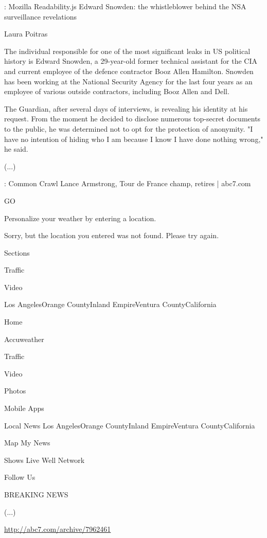 \documentclass[12pt, utf8, ngerman]{beamer}
\begin{document}
\begin{frame}{\insertsection: Mozilla Readability.js}
    \scriptsize
    Edward Snowden: the whistleblower behind the NSA surveillance revelations

    Laura Poitras

    The individual responsible for one of the most significant leaks in US political history is Edward Snowden, a 29-year-old former technical assistant for the CIA and current employee of the defence contractor Booz Allen Hamilton. Snowden has been working at the National Security Agency for the last four years as an employee of various outside contractors, including Booz Allen and Dell.

    The Guardian, after several days of interviews, is revealing his identity at his request. From the moment he decided to disclose numerous top-secret documents to the public, he was determined not to opt for the protection of anonymity. "I have no intention of hiding who I am because I know I have done nothing wrong," he said.

    (...)
\end{frame}

\begin{frame}{\insertsection: Common Crawl}
    \scriptsize
    Lance Armstrong, Tour de France champ, retires | abc7.com

    GO

    Personalize your weather by entering a location.

    Sorry, but the location you entered was not found. Please try again.

    Sections

    Traffic

    Video

    Los AngelesOrange CountyInland EmpireVentura CountyCalifornia

    Home

    Accuweather

    Traffic

    Video

    Photos

    Mobile Apps

    Local News Los AngelesOrange CountyInland EmpireVentura CountyCalifornia

    Map My News

    Shows Live Well Network

    Follow Us

    BREAKING NEWS

    (...)

    \vspace{.2cm}
    \url{http://abc7.com/archive/7962461}
\end{frame}
\end{document}
